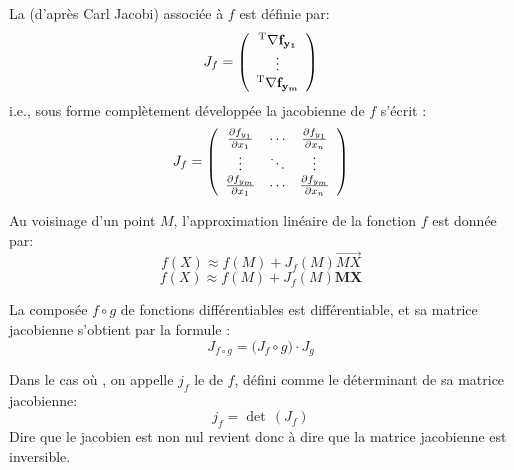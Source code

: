 \medskip\fi
La  (d'après Carl Jacobi) 
associée à $f$ est définie par:
\begin{equation}
J_f = \left( \begin{array}{c} {}^\mathrm{T}\mathbf{\nabla f_{y_1}} \\ \vdots \\ {}^\mathrm{T}\mathbf{\nabla f_{y_m}} \end{array}\right)
\end{equation}
i.e., sous forme complètement développée la jacobienne de $f$ s'écrit :
\begin{equation}
J_f = \left( \begin{array}{ccc} \frac{\partial f_{y_1}}{\partial x_1} & \cdots & \frac{\partial f_{y_1}}{\partial x_n} \\ \vdots & \ddots & \vdots \\ \frac{\partial f_{y_m}}{\partial x_1} & \cdots & \frac{\partial f_{y_m}}{\partial x_n} \end{array}\right)
\end{equation}
\ifVersionDuDocEstVincent

\medskip\fi
Au voisinage d'un point $M$, l'approximation linéaire de la fonction $f$ est donnée par:
\ifVersionDuDocEstVincent
\begin{equation} f\left(X\right) \approx f\left(M\right) + J_f\left(M\right) \overrightarrow{MX}\end{equation}
\else
\begin{equation} f\left(X\right) \approx f\left(M\right) + J_f\left(M\right) \mathbf{MX}\end{equation}
\fi
\ifVersionDuDocEstVincent

\medskip\fi
La composée $f\circ g$ de fonctions différentiables est différentiable, et sa matrice jacobienne 
s'obtient par la formule :
\begin{equation} J_{f \circ g}= \bigl( J_f \circ g \bigr) \cdot J_g\end{equation}
\ifVersionDuDocEstVincent

\medskip\fi
Dans le cas où , on appelle $j_f$ le  de $f$, 
défini comme le déterminant de sa matrice jacobienne: 
\begin{equation} j_f = \det\, \left(J_f \right) \end{equation}
Dire que le jacobien est non nul revient donc à dire que la matrice jacobienne est inversible.


